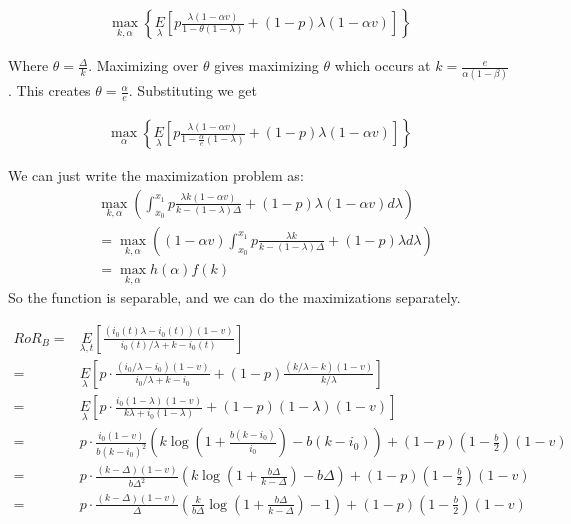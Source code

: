 {\arpit
\begin{align*}
\max_{k,\alpha} \left\{\underset{\lambda}E\left[p\frac{\lambda(1-\alpha v)}{1-\theta(1-\lambda)} + (1-p)\lambda (1-\alpha v)\right]\right\}
\end{align*}

Where $\theta = \frac{\Delta}{k}$. Maximizing over $\theta$ gives maximizing $\theta$ which occurs at $k = \frac{e}{\alpha (1-\beta)}$.
This creates $\theta = \frac{\alpha}{e}$. Substituting we get

\begin{align*}
\max_{\alpha} \left\{\underset{\lambda}E\left[p\frac{\lambda(1-\alpha v)}{1-\frac{\alpha}{e}(1-\lambda)} + (1-p)\lambda (1-\alpha v)\right]\right\}
\end{align*}
}

{\nolan

We can just write the maximization problem as:
\begin{align*}
&\max_{k,\alpha} \left(\int_{x_0}^{x_1} p \frac{\lambda k (1-\alpha v)}{k-(1-\lambda) \Delta} + (1-p)\lambda (1-\alpha v) d\lambda \right) \\
&= \max_{k,\alpha} \left((1-\alpha v) \int_{x_0}^{x_1} p \frac{\lambda k}{k-(1-\lambda) \Delta} + (1-p)\lambda d\lambda \right) \\
&= \max_{k,\alpha} h(\alpha)f(k)
\end{align*}
So the function is separable, and we can do the maximizations separately.
}

\begin{align*}
RoR_B =& \underset{\lambda, t}E\left[\frac{(i_0(t)\lambda - i_0(t))(1-v)}{i_0(t)/\lambda + k - i_0(t)}\right]\\
                                     =& \underset{\lambda}E\left[p\cdot\frac{(i_0/\lambda - i_0)(1-v)}{i_0/\lambda + k - i_0} + (1-p)\frac{(k/\lambda - k)(1-v)}{k/\lambda}\right]\\
                                     =& \underset{\lambda}E\left[p\cdot\frac{i_0(1-\lambda)(1-v)}{k\lambda + i_0(1-\lambda)} + (1-p)(1-\lambda)(1-v)\right]\\
                                     =& p\cdot\frac{i_0(1-v)}{b(k-i_0)^2}\left(k\log\left(1+\frac{b(k-i_0)}{i_0}\right) - b(k-i_0)\right) + (1-p)(1-\frac{b}{2})(1-v)\\
                                     =& p\cdot\frac{(k-\Delta)(1-v)}{b\Delta^2}\left(k\log\left(1+\frac{b\Delta}{k-\Delta}\right) - b\Delta\right) + (1-p)(1-\frac{b}{2})(1-v)\\
                                     =& p\cdot\frac{(k-\Delta)(1-v)}{\Delta}\left(\frac{k}{b\Delta}\log\left(1+\frac{b\Delta}{k-\Delta}\right) - 1\right) + (1-p)(1-\frac{b}{2})(1-v)\label{eq:rorB_eval}
\end{align*}

